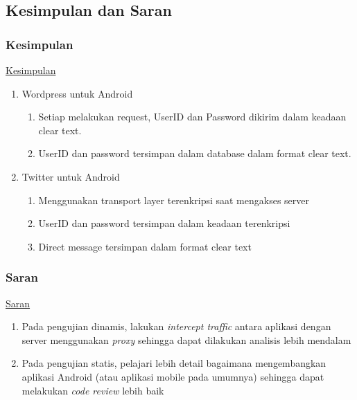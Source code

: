 \documentclass[xcolor=pdftex,table,10pt]{beamer}
\begin{document}
\subsection{Kesimpulan dan Saran}
\begin{frame}
	\frametitle{Kesimpulan}
	\underline{Kesimpulan} \\
	\begin{enumerate}
		\item Wordpress untuk Android
		\begin{enumerate}
			\item Setiap melakukan request, UserID dan Password dikirim dalam keadaan clear text. 
			\item UserID dan password tersimpan dalam database dalam format clear text. 
		\end{enumerate}
		\item Twitter untuk Android
		\begin{enumerate}
			\item Menggunakan transport layer terenkripsi saat mengakses server
			\item UserID dan password tersimpan dalam keadaan terenkripsi
			\item Direct message tersimpan dalam format clear text
		\end{enumerate}
	\end{enumerate}

\end{frame}

\begin{frame}
	\frametitle{Saran}
	\underline{Saran}	
	\begin{enumerate}
		\item Pada pengujian dinamis, lakukan \textit{intercept traffic} antara aplikasi dengan server menggunakan \textit{proxy} sehingga dapat dilakukan analisis lebih mendalam
		\item Pada pengujian statis, pelajari lebih detail bagaimana mengembangkan aplikasi Android (atau aplikasi mobile pada umumnya) sehingga dapat melakukan \textit{code review} lebih baik
	\end{enumerate}
\end{frame}

\begin{comment}
\subsection{Ringkasan}
\begin{frame}
	\frametitle{Ringkasan}
\end{frame}
\end{comment}
\end{document}
